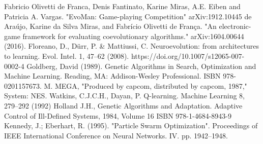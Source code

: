 \documentclass[conference]{IEEEtran}
\begin{document}
\begin{thebibliography}{00}
 Fabricio Olivetti de Franca, Denis Fantinato, Karine Miras, A.E. Eiben and Patricia A. Vargas.
"EvoMan: Game-playing Competition" arXiv:1912.10445
 de Araújo, Karine da Silva Miras, and Fabrício Olivetti de França.
"An electronic-game framework for evaluating coevolutionary algorithms." arXiv:1604.00644 (2016).
 Floreano, D., Dürr, P. & Mattiussi, C. Neuroevolution: from architectures to learning. Evol. Intel. 1, 47–62 (2008). https://doi.org/10.1007/s12065-007-0002-4
Goldberg, David (1989).
Genetic Algorithms in Search, Optimization and Machine Learning.
Reading, MA: Addison-Wesley Professional. ISBN 978-0201157673.
 M. MEGA, "Produced by capcom, distributed by capcom, 1987," System: NES.
 Watkins, C.J.C.H., Dayan, P. Q-learning. Machine Learning 8, 279–292 (1992)
 Holland J.H., Genetic Algorithms and Adaptation. Adaptive Control of Ill-Defined Systems, 1984, Volume 16 ISBN 978-1-4684-8943-9
 Kennedy, J.; Eberhart, R. (1995). "Particle Swarm Optimization". Proceedings of IEEE International Conference on Neural Networks. IV. pp. 1942–1948.

\end{thebibliography}
\end{document}
